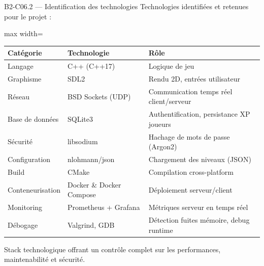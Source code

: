\documentclass[aspectratio=169,10pt]{beamer}
\begin{document}
\begin{frame}{B2-C06.2 — Identification des technologies}
\footnotesize
Technologies identifiées et retenues pour le projet :

\vspace{0.2em}
\begin{adjustbox}{max width=\textwidth}
\begin{tabular}{l l l}
\toprule
\textbf{Catégorie} & \textbf{Technologie} & \textbf{Rôle} \\
\midrule
Langage        & C++ (C++17)           & Logique de jeu \\ \hline
Graphisme      & SDL2                  & Rendu 2D, entrées utilisateur \\ \hline
Réseau         & BSD Sockets (UDP)     & Communication temps réel client/serveur \\ \hline
Base de données & SQLite3              & Authentification, persistance XP joueurs \\ \hline
Sécurité       & libsodium             & Hachage de mots de passe (Argon2) \\ \hline
Configuration  & nlohmann/json         & Chargement des niveaux (JSON) \\ \hline
Build          & CMake                 & Compilation cross-platform \\ \hline
Conteneurisation & Docker \& Docker Compose & Déploiement serveur/client \\ \hline
Monitoring     & Prometheus + Grafana  & Métriques serveur en temps réel \\ \hline
Débogage       & Valgrind, GDB         & Détection fuites mémoire, debug runtime \\
\bottomrule
\end{tabular}
\end{adjustbox}

\vspace{0.3em}
Stack technologique offrant un contrôle complet sur les performances, maintenabilité et sécurité.
\end{frame}
\end{document}
